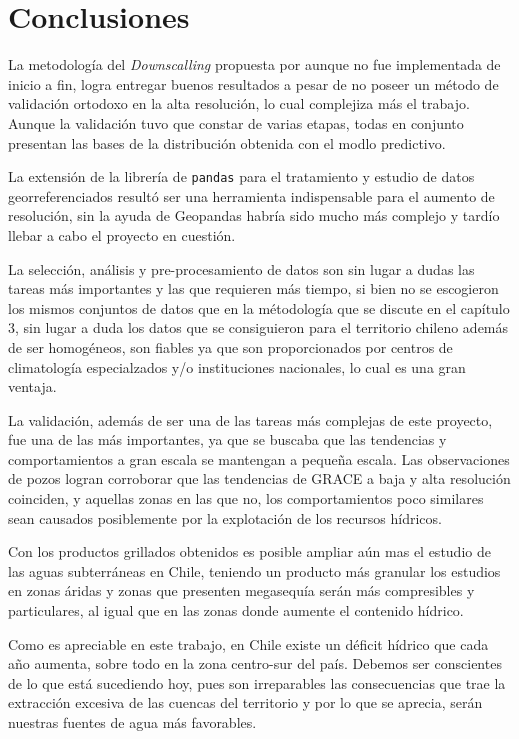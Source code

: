 \chapter{Conclusiones}
\label{C6}

La metodología del \textit{Downscalling} propuesta por \cite{11} aunque no fue implementada de inicio a fin, logra entregar buenos resultados a pesar de no poseer un método de validación ortodoxo en la alta resolución, lo cual
complejiza más el trabajo. Aunque la validación tuvo que constar de varias etapas, todas en conjunto presentan las bases de la distribución obtenida con el modlo predictivo.

La extensión de la librería de \texttt{pandas} para el tratamiento y estudio de datos georreferenciados resultó ser una herramienta indispensable para el aumento de resolución, sin la ayuda de Geopandas habría sido
mucho más complejo y tardío llebar a cabo el proyecto en cuestión.

La selección, análisis y pre-procesamiento de datos son sin lugar a dudas las tareas más importantes y las que requieren más tiempo, si bien no se escogieron los mismos conjuntos de datos que en la métodología que se discute 
en el capítulo 3, sin lugar a duda los datos que se consiguieron para el territorio chileno además de ser homogéneos, son fiables ya que son proporcionados por centros de climatología especialzados y/o instituciones nacionales, lo cual
es una gran ventaja.

La validación, además de ser una de las tareas más complejas de este proyecto, fue una de las más importantes, ya que se buscaba que las tendencias y comportamientos a gran escala se mantengan a pequeña escala. Las observaciones de pozos
logran corroborar que las tendencias de GRACE a baja y alta resolución coinciden, y aquellas zonas en las que no, los comportamientos poco similares sean causados posiblemente por la explotación de los recursos hídricos.

Con los productos grillados obtenidos es posible ampliar aún mas el estudio de las aguas subterráneas en Chile, teniendo un producto más granular los estudios en zonas áridas y zonas que presenten megasequía serán 
más compresibles y particulares, al igual que en las zonas donde aumente el contenido hídrico.

Como es apreciable en este trabajo, en Chile existe un déficit hídrico que cada año aumenta, sobre todo en la zona centro-sur del país. Debemos ser conscientes de lo que está sucediendo hoy, pues son irreparables las consecuencias que trae
la extracción excesiva de las cuencas del territorio y por lo que se aprecia, serán nuestras fuentes de agua más favorables.